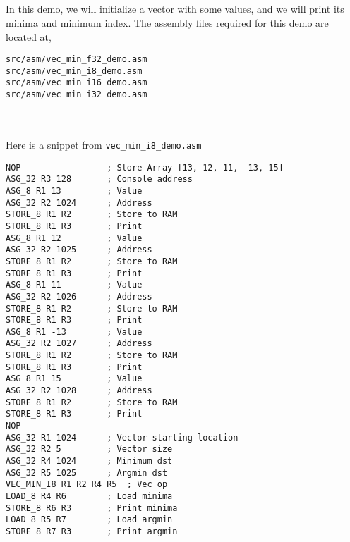 \begin{paper}
\renewcommand*{\pagemark}{}

\section*{}
In this demo, we will initialize a vector with some values, and we will print its minima and minimum index. The assembly files required for this demo are located at,
\begin{verbatim}
src/asm/vec_min_f32_demo.asm
src/asm/vec_min_i8_demo.asm
src/asm/vec_min_i16_demo.asm
src/asm/vec_min_i32_demo.asm
\end{verbatim}\\\\
\nointend Here is a snippet from \texttt{vec\_min\_i8\_demo.asm}
\begin{verbatim}
NOP                 ; Store Array [13, 12, 11, -13, 15]
ASG_32 R3 128       ; Console address
ASG_8 R1 13         ; Value
ASG_32 R2 1024      ; Address
STORE_8 R1 R2       ; Store to RAM
STORE_8 R1 R3       ; Print
ASG_8 R1 12         ; Value
ASG_32 R2 1025      ; Address
STORE_8 R1 R2       ; Store to RAM
STORE_8 R1 R3       ; Print
ASG_8 R1 11         ; Value
ASG_32 R2 1026      ; Address
STORE_8 R1 R2       ; Store to RAM
STORE_8 R1 R3       ; Print
ASG_8 R1 -13        ; Value
ASG_32 R2 1027      ; Address
STORE_8 R1 R2       ; Store to RAM
STORE_8 R1 R3       ; Print
ASG_8 R1 15         ; Value
ASG_32 R2 1028      ; Address
STORE_8 R1 R2       ; Store to RAM
STORE_8 R1 R3       ; Print
NOP
ASG_32 R1 1024      ; Vector starting location
ASG_32 R2 5         ; Vector size
ASG_32 R4 1024      ; Minimum dst
ASG_32 R5 1025      ; Argmin dst
VEC_MIN_I8 R1 R2 R4 R5  ; Vec op
LOAD_8 R4 R6        ; Load minima
STORE_8 R6 R3       ; Print minima
LOAD_8 R5 R7        ; Load argmin
STORE_8 R7 R3       ; Print argmin
\end{verbatim}\\\\


\end{paper}
